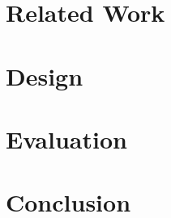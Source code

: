 \documentclass[conference]{IEEEtran}
\begin{document}
\section{Related Work}

\section{Design}

\section{Evaluation}

\section{Conclusion}

\nocite{*} %




\end{document}
